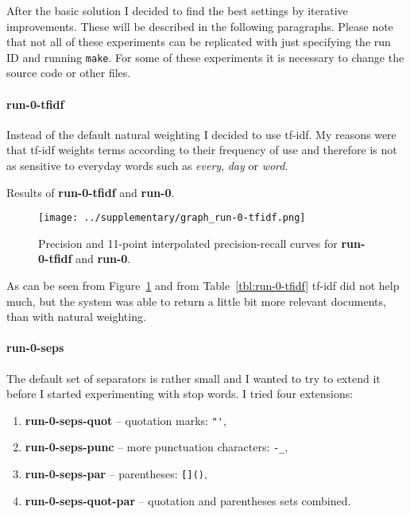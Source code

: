 \documentclass[10pt]{article}
\newcommand{\Run}[1]{\textbf{#1}}
\begin{document}
After the basic solution I decided to find the best settings by iterative
improvements. These will be described in the following paragraphs. Please note
that not all of these experiments can be replicated with just specifying the run
ID and running \texttt{make}. For some of these experiments it is necessary to
change the source code or other files.

\paragraph{run-0-tfidf} Instead of the default natural weighting I decided to use
tf-idf. My reasons were that tf-idf weights terms according to their frequency
of use and therefore is not as sensitive to everyday words such as \emph{every},
\emph{day} or \emph{word}.

\begin{table}[h]
\centering

    \caption{Results of \Run{run-0-tfidf} and \Run{run-0}.\label{tbl:run-0-tfidf}}
\end{table}

\begin{figure}[h]
\centering
\texttt{[image: ../supplementary/graph\_run-0-tfidf.png]}
    \caption{Precision and 11-point interpolated precision-recall curves for
    \Run{run-0-tfidf} and \Run{run-0}.\label{fig:run-0-tfidf}}
\end{figure}

As can be seen from Figure~\ref{fig:run-0-tfidf} and from
Table~\ref{tbl:run-0-tfidf} tf-idf did not help much, but the system was able to return
a little bit more relevant documents, than with natural weighting.

\paragraph{run-0-seps} The default set of separators is rather small and I
wanted to try to extend it before I started experimenting with stop words. I
tried four extensions:
\begin{enumerate}
    \item \Run{run-0-seps-quot} -- quotation marks: \verb|"'|,
    \item \Run{run-0-seps-punc} -- more punctuation characters: \verb|-_|,
    \item \Run{run-0-seps-par} -- parentheses: \verb|[]()|,
    \item \Run{run-0-seps-quot-par} -- quotation and parentheses sets combined.
\end{enumerate}
\end{document}
